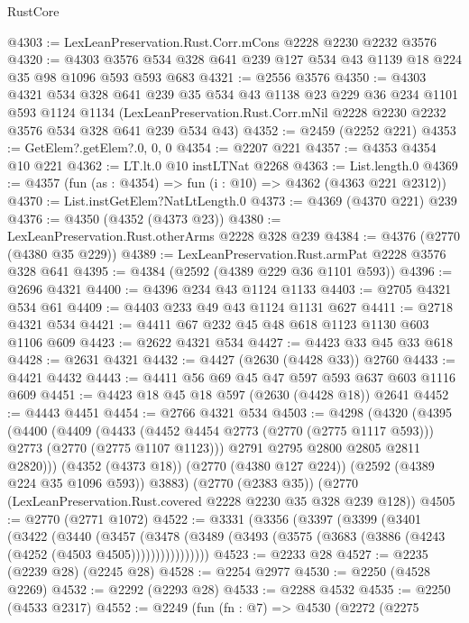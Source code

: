 \begin{lexlean}{RustCore}
\begin{coremodule}
@4303 := LexLeanPreservation.Rust.Corr.mCons @2228 @2230 @2232 @3576
@4320 := @4303 @3576 @534 @328 @641 @239 @127 @534 @43 @1139 @18 @224 @35 @98 @1096 @593 @593 @683
@4321 := @2556 @3576
@4350 := @4303
    @4321
    @534
    @328
    @641
    @239
    @35
    @534
    @43
    @1138
    @23
    @229
    @36
    @234
    @1101
    @593
    @1124
    @1134
    (LexLeanPreservation.Rust.Corr.mNil @2228 @2230 @2232 @3576 @534 @328 @641 @239 @534 @43)
@4352 := @2459 (@2252 @221)
@4353 := GetElem?.getElem?.{0, 0, 0}
@4354 := @2207 @221
@4357 := @4353 @4354 @10 @221
@4362 := LT.lt.{0} @10 instLTNat @2268
@4363 := List.length.{0}
@4369 := @4357 (fun (as : @4354) => fun (i : @10) => @4362 (@4363 @221 @2312))
@4370 := List.instGetElem?NatLtLength.{0}
@4373 := @4369 (@4370 @221) @239
@4376 := @4350 (@4352 (@4373 @23))
@4380 := LexLeanPreservation.Rust.otherArms @2228 @328 @239
@4384 := @4376 (@2770 (@4380 @35 @229))
@4389 := LexLeanPreservation.Rust.armPat @2228 @3576 @328 @641
@4395 := @4384 (@2592 (@4389 @229 @36 @1101 @593))
@4396 := @2696 @4321
@4400 := @4396 @234 @43 @1124 @1133
@4403 := @2705 @4321 @534 @61
@4409 := @4403 @233 @49 @43 @1124 @1131 @627
@4411 := @2718 @4321 @534
@4421 := @4411 @67 @232 @45 @48 @618 @1123 @1130 @603 @1106 @609
@4423 := @2622 @4321 @534
@4427 := @4423 @33 @45 @33 @618
@4428 := @2631 @4321
@4432 := @4427 (@2630 (@4428 @33)) @2760
@4433 := @4421 @4432
@4443 := @4411 @56 @69 @45 @47 @597 @593 @637 @603 @1116 @609
@4451 := @4423 @18 @45 @18 @597 (@2630 (@4428 @18)) @2641
@4452 := @4443 @4451
@4454 := @2766 @4321 @534
@4503 := @4298
    (@4320
      (@4395
        (@4400
          (@4409
            (@4433 (@4452 @4454 @2773 (@2770 (@2775 @1117 @593))) @2773 (@2770 (@2775 @1107 @1123)))
            @2791
            @2795
            @2800
            @2805
            @2811
            @2820)))
      (@4352 (@4373 @18))
      (@2770 (@4380 @127 @224))
      (@2592 (@4389 @224 @35 @1096 @593))
      @3883)
    (@2770 (@2383 @35))
    (@2770 (LexLeanPreservation.Rust.covered @2228 @2230 @35 @328 @239 @128))
@4505 := @2770 (@2771 @1072)
@4522 := @3331
    (@3356
      (@3397
        (@3399
          (@3401
            (@3422
              (@3440
                (@3457
                  (@3478
                    (@3489 (@3493 (@3575 (@3683 (@3886 (@4243 (@4252 (@4503 @4505))))))))))))))))
@4523 := @2233 @28
@4527 := @2235 (@2239 @28) (@2245 @28)
@4528 := @2254 @2977
@4530 := @2250 (@4528 @2269)
@4532 := @2292 (@2293 @28)
@4533 := @2288 @4532
@4535 := @2250 (@4533 @2317)
@4552 := @2249
    (fun (fn : @7) =>
    @4530
      (@2272
        (@2275

\end{coremodule}
\end{lexlean}
